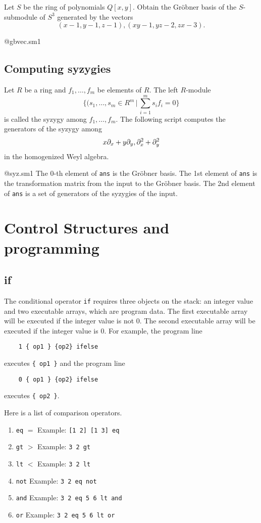 \begin{example}
Let $S$ be the ring of polynomials
$Q [x,y]$.
Obtain the Gr\"obner basis of the $S$-submodule of $S^3$
generated by the vectors
$$ (x-1,y-1,z-1), (xy-1,yz-2,zx-3). $$
\end{example}

@gbvec.sm1
\bigbreak

\subsection{Computing syzygies}

Let $R$ be a ring and $f_1, \ldots, f_m$ be elements of $R$.
The left $R$-module 
$$ \{ (s_1, \ldots, s_m \in R^m \,|\, \sum_{i=1}^m s_i f_i = 0 \} $$
is called the syzygy among $f_1, \ldots, f_m$.
The following script computes the generators of the syzygy
among
$$ x \partial_{x} + y \partial_{y},
   \partial_{x}^2+\partial_{y}^2
$$
in the homogenized Weyl algebra.

@syz.sm1
The 0-th element of {\tt ans} is the Gr\"obner basis.
The 1st element of {\tt ans} is the transformation matrix from the input
to the Gr\"obner basis.
The 2nd element of {\tt ans} is a set of generators of the syzygies
of the input.

\bigbreak


\section{Control Structures and programming}

\subsection{if}
The conditional operator {\tt if} requires three objects on the stack:
an integer value and two executable arrays, which are program data.
The first executable array will be executed if the integer value is not 0.
The second executable array will be executed if the integer value is 0.
For example, the program line
\begin{verbatim}
    1 { op1 } {op2} ifelse
\end{verbatim}
executes {\tt \{ op1 \}} and the program line
\begin{verbatim}
    0 { op1 } {op2} ifelse
\end{verbatim}
executes {\tt \{ op2 \}}.

Here is a list of comparison operators.
\begin{enumerate}
\item[] {\tt eq} \quad $=$ \quad  Example: {\tt [1 2] [1 3] eq }
\item[] {\tt gt} \quad $>$ \quad  Example: {\tt 3 2 gt}
\item[] {\tt lt} \quad $<$ \quad  Example: {\tt 3 2 lt}
\item[] {\tt not}  \quad  Example: {\tt 3 2 eq not}
\item[] {\tt and}  \quad  Example: {\tt 3 2 eq 5 6 lt and }
\item[] {\tt or}  \quad  Example: {\tt 3 2 eq 5 6 lt or }
\end{enumerate}


